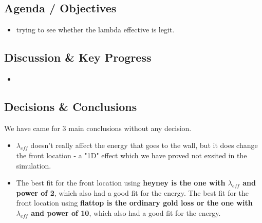 \documentclass[11pt,a4paper]{article}
\begin{document}
\subsection{Agenda / Objectives}
\begin{itemize}
    \item trying to see whether the lambda effective is legit.
\end{itemize}

\subsection{Discussion \& Key Progress}
\begin{itemize}
    \item 
\end{itemize}

\subsection{Decisions \& Conclusions}
We have came for 3 main conclusions without any decision.
\begin{itemize}
    \item $\lambda_{eff}$ doesn't really affect the energy that goes to the wall, but it does change the front location - a "1D" effect which we have proved not exsited in the simulation. 
    \item The best fit for the front location using \textbf{heyney is the one with $\lambda_{eff}$ and power of 2}, which also had a good fit for the energy. The best fit for the front location using \textbf{flattop is the ordinary gold loss or the one with $\lambda_{eff}$ and power of 10}, which also had a good fit for the energy. 
\end{itemize}
\end{document}
